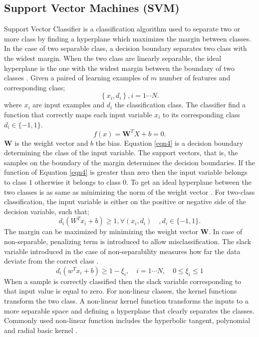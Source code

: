 \documentclass[final,5p,times,twocolumn,authoryear]{elsarticle}
\begin{document}
\subsection{Support Vector Machines  (SVM)}\label{SVM}
Support Vector Classifier is a classification algorithm used to separate two or more class by finding a hyperplane which maximizes the margin between classes. In the case of two separable class, a decision boundary separates two class with the widest margin. When the two class are linearly separable, the ideal hyperplane is the one with the widest margin between the boundary of two classes \cite{friedman2001elements}. Given a paired of learning examples of $m$ number of features and corresponding class;   
\begin{equation}\label{eqn3}
\left\lbrace   x_{i},d_{i}\right\rbrace , i = 1 \cdots N.
\end{equation}
where $x_{i}$ are input examples and $d_{i}$ the classification class. The classifier find a function that correctly maps each input variable $x_{i}$ to its corresponding class $ d_{i} \in \{ -1, 1\}$. 
\begin{equation}\label{eqn4}
f(x) = \textbf{W}^{T}X + b = 0.
\end{equation}
$\textbf{W}$ is the weight vector and $b$ the bias. Equation \eqref{eqn4} is a decision boundary determining the class of the input variable. The support vectors, that is, the samples on the boundary of the margin determines the decision boundaries. If the function of Equation \eqref{eqn4} is greater than zero then the input variable belongs to class $1$ otherwise it belongs to class $0$. To get  an ideal hyperplane between the two classes is as same as minimizing the norm of the weight vector \cite{friedman2001elements}. For two-class classification, the input variable is either on the positive or negative side of the decision variable, such that;
\begin{equation}
d_{i}(W^{T}x_{i} + b)\geq 1, \forall (x_{i},d_{i}) \quad , d_{i} \in \{ -1,1\}.
\end{equation}
The margin can be maximized by minimizing the weight vector $\textbf{W}$. In case of non-separable, penalizing term is introduced to allow misclassification. The slack variable introduced in the case of non-separability measures how far the data deviate from the correct class
\cite{kelleher2015fundamentals} .
\begin{equation}
d_{i}(w^{T}x_{i} + b)\geq 1 - \xi_{i},  \quad i = 1 \cdots N, \quad 0 \leq \xi_{i} \leq 1
\end{equation}
 When a sample is correctly classified then the slack variable corresponding to that input value is equal to zero. For non-linear classes, the kernel functions transform the two class. A non-linear kernel function transforms the inputs to a more separable space and defining a hyperplane that clearly separates the classes.  Commonly used non-linear function includes the hyperbolic tangent, polynomial and radial basic kernel \cite{aggarwal2014data}.
\end{document}
